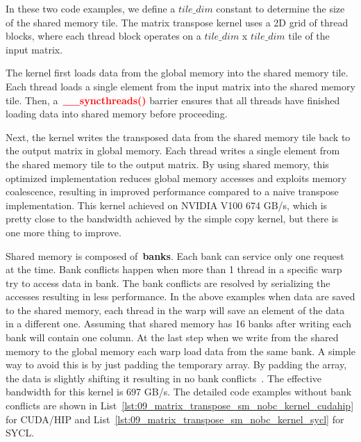 \par
In these two code examples, we define a $tile\_dim$ constant to determine the size of the shared memory tile.
The matrix transpose kernel uses a 2D grid of thread blocks, where each thread block operates on a $tile\_dim$ x $tile\_dim$ tile of the input matrix.

\par
The kernel first loads data from the global memory into the shared memory tile.
Each thread loads a single element from the input matrix into the shared memory tile.
Then, a~\textbf{\textcolor{red}{\_\_syncthreads()}} barrier ensures that all threads have finished loading data into shared memory before proceeding.


\par
Next, the kernel writes the transposed data from the shared memory tile back to the output matrix in global memory.
Each thread writes a single element from the shared memory tile to the output matrix.
By using shared memory, this optimized implementation reduces global memory accesses and exploits memory coalescence, resulting in improved performance compared to a naive transpose implementation.
This kernel achieved on NVIDIA V100 674 GB/s, which is pretty close to the bandwidth achieved by the simple copy kernel, but there is one more thing to improve.


\par
Shared memory is composed of~\textbf{banks}.
Each bank can service only one request at the time.
Bank conflicts happen when more than 1 thread in a specific warp try to access data in bank.
The bank conflicts are resolved by serializing the accesses resulting in less performance.
In the above examples when data are saved to the shared memory, each thread in the warp will save an element of the data in a different one.
Assuming that shared memory has 16 banks after writing each bank will contain one column.
At the last step when we write from the shared memory to the global memory each warp load data from the same bank.
A simple way to avoid this is by just padding the temporary array.
By padding the array, the data is slightly shifting it resulting in no bank conflicts~\cite{matrix_transpose_efficient, matrix_transpose_advanced}.
The effective bandwidth for this kernel is 697 GB/s.
The detailed code examples without bank conflicts are shown in List~\ref{lst:09_matrix_transpose_sm_nobc_kernel_cudahip} for CUDA/HIP and List~\ref{lst:09_matrix_transpose_sm_nobc_kernel_sycl} for SYCL.




